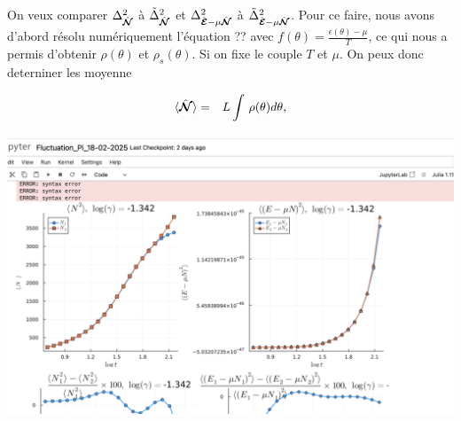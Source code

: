 On veux comparer $\Delta_{\hat{\bm{\mathcal{N}}}}^2$ à $\tilde{\Delta}_{\hat{\bm{\mathcal{N}}}}^2$ et $\Delta_{\hat{\bm{\mathcal{E}}}-\mu \hat{\bm{\mathcal{N}}}}^2$ à $\tilde{\Delta}_{\hat{\bm{\mathcal{E}}}-\mu \hat{\bm{\mathcal{N}}}}^2 $. Pour ce faire, nous avons d'abord résolu numériquement l'équation {??} avec \( f(\theta) = \frac{\epsilon(\theta) - \mu}{T} \),  ce qui nous a permis d'obtenir \( \rho(\theta) \) et \( \rho_s(\theta) \). Si on fixe le couple $T$ et $\mu$. On peux donc deterniner les moyenne 

\begin{eqnarray*}
	\langle \hat{\bm{\mathcal{N}}} \rangle & = & L \int \, \rho(\theta) d \theta ,		
\end{eqnarray*}



\includegraphics[width=1\textwidth]{Figures/test}







 







